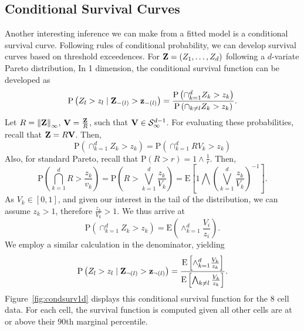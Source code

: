 \subsection{Conditional Survival Curves}
Another interesting inference we can make from a fitted model is a conditional survival curve.
  Following rules of conditional probability, we can develop survival curves based on
  threshold exceedences. For ${\bf Z} = (Z_1,\ldots,Z_d)$ following a $d$-variate Pareto distribution,
  In 1 dimension, the conditional survival function can be developed as
  \begin{equation}
    \label{eqn:condsurv1d}
    \text{P}\left(Z_l > z_l\mid {\bf Z}_{-(l)} > {\bf z}_{-(l)}\right) =
      \frac{\text{P}\left(\cap_{k = 1}^d Z_k > z_k\right)}{\text{P}\left(\cap_{k \neq l} Z_k > z_k\right)}.
  \end{equation}
  Let $R = \left\lVert {\bf Z} \right\rVert_{\infty}$, ${\bf V} = \frac{{\bf Z}}{R}$, such that ${\bf V}\in \mathcal{S}_{\infty}^{d-1}$.
  For evaluating these probabilities, recall that ${\bf Z} = R{\bf V}$.  Then,
  \begin{equation}
    \text{P}\left(\cap_{k = 1}^d Z_k > z_k\right) = \text{P}\left(\cap_{k = 1}^d RV_k > z_k\right)
  \end{equation}
  Also, for standard Pareto, recall that $\text{P}(R > r) = 1\wedge\frac{1}{r}$.  Then,
  \begin{equation}
    \text{P}\left(\bigcap_{k = 1}^d R > \frac{z_k}{v_k}\right) =
      \text{P}\left(R  > \bigvee_{k=1}^d\frac{z_k}{V_k}\right) =
      \text{E}\left[1 \bigwedge \left(\bigvee_{k = 1}^d\frac{z_k}{V_k}\right)^{-1}\right].
  \end{equation}
  As $V_k \in [0,1]$, and given our interest in the tail of the distribution, we can assume $z_k > 1$,
  therefore $\frac{z_k}{V_k} > 1$.  We thus arrive at
  \begin{equation}
    \text{P}\left(\cap_{k = 1}^dZ_k > z_k\right) = \text{E}\left(\wedge_{k = 1}^d\frac{V_i}{z_i}\right).
  \end{equation}
  We employ a similar calculation in the denominator, yielding
  \begin{equation}
    \label{eqn:condsurv1df}
    \text{P}\left(Z_l > z_l\mid {\bf Z}_{\neg(l)} > {\bf z}_{\neg(l)}\right) =
      \frac{\text{E}\left[\wedge_{k = 1}^d \frac{V_k}{z_k}\right]}{\text{E}\left[\bigwedge_{k \neq l}\frac{V_k}{z_k}\right]}.
  \end{equation}
  Figure~\ref{fig:condsurv1d} displays this conditional survival function for the 8 cell data. For each
  cell, the survival function is computed given all other cells are at or above their $90$th marginal
  percentile.

